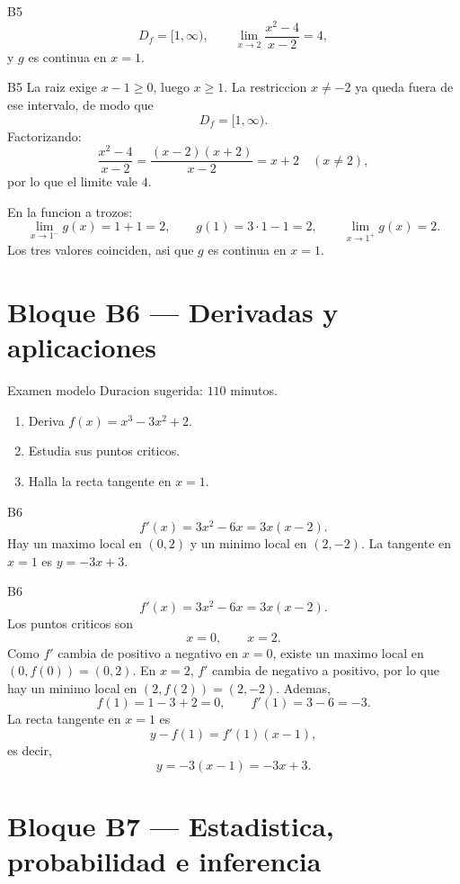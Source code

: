 \begin{shortanswer}{B5}
\[
D_f=[1,\infty),\qquad
\lim_{x\to 2}\frac{x^2-4}{x-2}=4,
\]
y \(g\) es continua en \(x=1\).
\end{shortanswer}

\begin{fullsolution}{B5}
La raiz exige \(x-1\geq 0\), luego \(x\geq 1\). La restriccion \(x\neq -2\) ya queda fuera de
ese intervalo, de modo que
\[
D_f=[1,\infty).
\]
Factorizando:
\[
\frac{x^2-4}{x-2}=\frac{(x-2)(x+2)}{x-2}=x+2 \quad (x\neq 2),
\]
por lo que el limite vale \(4\).

En la funcion a trozos:
\[
\lim_{x\to 1^-}g(x)=1+1=2,
\qquad
g(1)=3\cdot 1-1=2,
\qquad
\lim_{x\to 1^+}g(x)=2.
\]
Los tres valores coinciden, asi que \(g\) es continua en \(x=1\).
\end{fullsolution}

\section{Bloque B6 --- Derivadas y aplicaciones}

\begin{exambrief}{Examen modelo}
Duracion sugerida: \(110\) minutos.
\begin{enumerate}
  \item Deriva \(f(x)=x^3-3x^2+2\).
  \item Estudia sus puntos criticos.
  \item Halla la recta tangente en \(x=1\).
\end{enumerate}
\end{exambrief}

\begin{shortanswer}{B6}
\[
f'(x)=3x^2-6x=3x(x-2).
\]
Hay un maximo local en \((0,2)\) y un minimo local en \((2,-2)\). La tangente en \(x=1\) es
\(y=-3x+3\).
\end{shortanswer}

\begin{fullsolution}{B6}
\[
f'(x)=3x^2-6x=3x(x-2).
\]
Los puntos criticos son
\[
x=0,\qquad x=2.
\]
Como \(f'\) cambia de positivo a negativo en \(x=0\), existe un maximo local en
\((0,f(0))=(0,2)\). En \(x=2\), \(f'\) cambia de negativo a positivo, por lo que hay un minimo
local en \((2,f(2))=(2,-2)\).
Ademas,
\[
f(1)=1-3+2=0,
\qquad
f'(1)=3-6=-3.
\]
La recta tangente en \(x=1\) es
\[
y-f(1)=f'(1)(x-1),
\]
es decir,
\[
y=-3(x-1)=-3x+3.
\]
\end{fullsolution}

\section{Bloque B7 --- Estadistica, probabilidad e inferencia}

